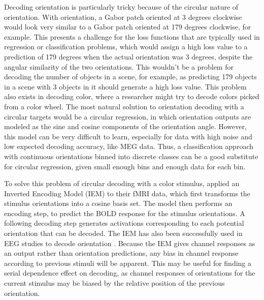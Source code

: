 \documentclass[../main.tex]{subfiles}
\begin{document}
Decoding orientation is particularly tricky because of the circular nature of orientation. With orientation, a Gabor patch oriented at 3 degrees clockwise would look very similar to a Gabor patch oriented at 179 degrees clockwise, for example. This presents a challenge for the loss functions that are typically used in regression or classification problems, which would assign a high loss value to a prediction of 179 degrees when the actual orientation was 3 degrees, despite the angular similarity of the two orientations. This wouldn't be a problem for decoding the number of objects in a scene, for example, as predicting 179 objects in a scene with 3 objects in it should generate a high loss value. This problem also exists in decoding color, where a researcher might try to decode colors picked from a color wheel. The most natural solution to orientation decoding with a circular targets would be a circular regression, in which orientation outputs are modeled as the sine and cosine components of the orientation angle. However, this model can be very difficult to learn, especially for data with high noise and low expected decoding accuracy, like MEG data. Thus, a classification approach with continuous orientations binned into discrete classes can be a good substitute for circular regression, given small enough bins and enough data for each bin.

To solve this problem of circular decoding with a color stimulus, \cite{Brouwer09} applied an Inverted Encoding Model (IEM) to their fMRI data, which first transforms the stimulus orientations into a cosine basis set. The model then performs an encoding step, to predict the BOLD response for the stimulus orientations. A following decoding step generates activations corresponding to each potential orientation that can be decoded. The IEM has also been successfully used in EEG studies to decode orientation \citep{GARCIA2013515, sprague_serences_2013, sprague_saproo_serences_2015}. Because the IEM gives channel responses as an output rather than orientation predictions, any bias in channel response according to previous stimuli will be apparent. This may be useful for finding a serial dependence effect on decoding, as channel responses of orientations for the current stimulus may be biased by the relative position of the previous orientation.
\end{document}
